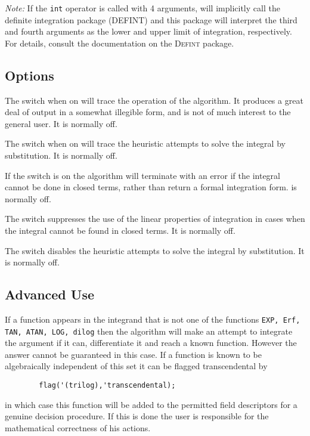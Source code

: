 \textit{Note:} If the \texttt{int} operator is called with 4 arguments,
{\REDUCE} will implicitly call the definite integration package (DEFINT)
and this package will interpret the third and fourth arguments as the lower
and upper limit of integration, respectively.  For details, consult
the documentation on the \textsc{Defint} package.


\subsection{Options}
\hypertarget{switch:TRINT}{}
\hypertarget{switch:TRINTSUBST}{}
\hypertarget{switch:FAILHARD}{}
\hypertarget{switch:NOLNR}{}
\hypertarget{switch:NOINTSUBST}{}

The switch  when on will trace the operation of the algorithm. It
produces a great deal of output in a somewhat illegible form, and is not
of much interest to the general user. It is normally off.

The switch  when on will trace the heuristic attempts to
solve the integral by substitution. It is normally off.

If the switch  is on the algorithm will terminate with an
error if the integral cannot be done in closed terms, rather than return a
formal integration form.  is normally off.

The switch  suppresses the use of the linear properties of
integration in cases when the integral cannot be found in closed terms.
It is normally off.

The switch  disables the heuristic attempts to solve
the integral by substitution. It is normally off.

\subsection{Advanced Use}
\hypertarget{operator:ERF}{}

If a function appears in the integrand that is not one of the functions
\texttt{EXP, Erf, TAN, ATAN, LOG, dilog}
then the algorithm will make an
attempt to integrate the argument if it can, differentiate it and reach a
known function.  However the answer cannot be guaranteed in this case.  If
a function is known to be algebraically independent of this set it can be
flagged transcendental by
\begin{verbatim}
        flag('(trilog),'transcendental);
\end{verbatim}
in which case this function will be added to the permitted field
descriptors for a genuine decision procedure. If this is done the user is
responsible for the mathematical correctness of his actions.

